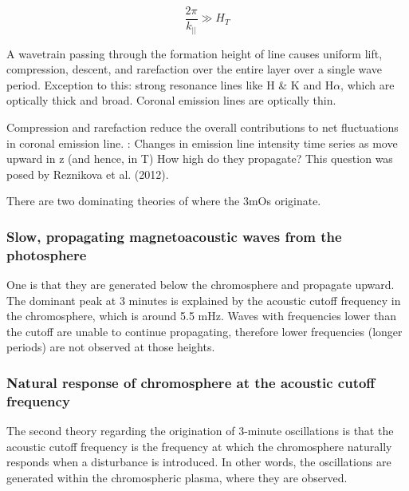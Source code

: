     \begin{equation}
        \frac{2\pi}{k_{||}} \gg H_{T}
    \end{equation}

A wavetrain passing through the formation height of line causes uniform lift,
compression, descent, and rarefaction over the entire layer over a single wave
period. Exception to this: strong resonance lines like
 H \& K and H$\alpha$, which
are optically thick and broad.
Coronal emission lines are optically thin.

Compression and rarefaction reduce the overall contributions to net
fluctuations in coronal emission line.
:
Changes in emission line intensity time series as move upward in z
(and hence, in T)
How high do they propagate? This question was posed by Reznikova et al. (2012).





There are two dominating theories of where the 3mOs originate.


\subsubsection{Slow, propagating magnetoacoustic waves from the photosphere}

One is that they are generated below the chromosphere and
propagate upward. The dominant peak at 3 minutes is explained by
the acoustic cutoff frequency in the chromosphere, which is around
5.5 mHz.
Waves with frequencies lower than the cutoff are unable to continue
propagating, therefore lower frequencies (longer periods) are not
observed at those heights.


\subsubsection{%
    Natural response of chromosphere at the acoustic cutoff frequency}

The second theory regarding the origination of 3-minute oscillations
is that the acoustic cutoff frequency is the frequency at which the
chromosphere naturally responds when a disturbance is introduced.
In other words, the oscillations are
generated within the chromospheric plasma, where they are observed.

